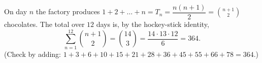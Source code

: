On day $n$ the factory produces $1+2+\dots+n=T_n=\dfrac{n(n+1)}{2}=\binom{n+1}{2}$ chocolates. The total over $12$ days is, by the hockey-stick identity,
\[
\sum_{n=1}^{12}\binom{n+1}{2}=\binom{14}{3}=\dfrac{14\cdot13\cdot12}{6}=\boxed{364}.
\]
(Check by adding: $1+3+6+10+15+21+28+36+45+55+66+78=364$.)
